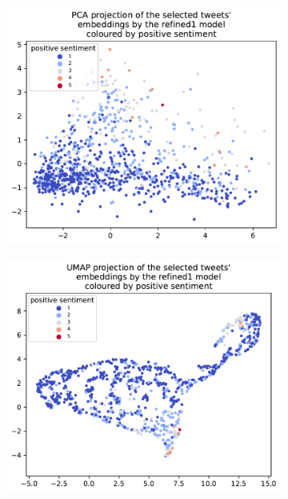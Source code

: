 \begin{figure}
\begin{subfigure}{0.49\textwidth}
        \caption{}\label{fig:p2t-embeddings-many-fixed-umap}
    \end{subfigure}
    \begin{subfigure}{0.49\textwidth}
        \includegraphics[width=\textwidth]{images/transformer_embedding_many_refined1_pca_positive.pdf}
        \caption{}\label{fig:p2t-embeddings-many-refined1-pca}
    \end{subfigure}
    \hfill
    \begin{subfigure}{0.49\textwidth}
        \includegraphics[width=\textwidth]{images/transformer_embedding_many_refined1_umap_positive.pdf}

\end{subfigure}
\end{figure}
